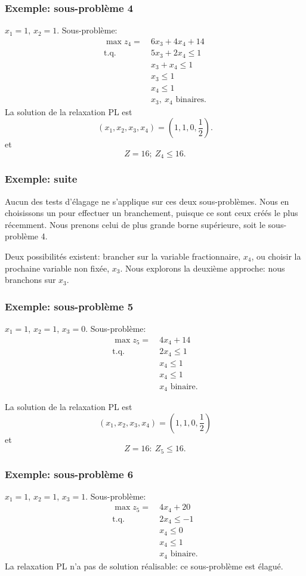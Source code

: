 \documentclass[usepdftitle=false]{beamer}
\def\st{\mbox{t.q. }}
\begin{document}
\begin{frame}
\frametitle{Exemple: sous-problème 4}

$x_1 = 1$, $x_2 = 1$. Sous-problème:
\begin{align*}
\max z_4 =\ & 6x_3 + 4x_4 + 14 \\
\st{} & 5 x_3 + 2x_4 \leq 1 \\
& x_3 + x_4 \leq 1 \\
& x_3 \leq 1 \\
& x_4 \leq 1 \\
& x_3,\ x_4 \mbox{ binaires}.
\end{align*}
La solution de la relaxation PL est
\[
( x_1, x_2, x_3, x_4) = \left(1,1,0, \frac{1}{2} \right).
\]
et
\[
Z = 16;\ Z_4 \leq 16.
\]

\end{frame}

\begin{frame}
\frametitle{Exemple: suite}

Aucun des tests d'élagage ne s'applique sur ces deux sous-problèmes.
Nous en choisissons un pour effectuer un branchement, puisque ce sont ceux créés le plus récemment.
Nous prenons celui de plus grande borne supérieure, soit le sous-problème 4.

\mbox{}

Deux possibilités existent: brancher sur la variable fractionnaire, $x_4$, ou choisir la prochaine variable non fixée, $x_3$.
Nous explorons la deuxième approche: nous branchons sur $x_3$.

\end{frame}

\begin{frame}
\frametitle{Exemple: sous-problème 5}

$x_1 = 1$, $x_2 = 1$, $x_3 = 0$. Sous-problème:
\begin{align*}
\max z_5 =\ & 4x_4 + 14 \\
\st{} & 2x_4 \leq 1 \\
& x_4 \leq 1 \\
& x_4 \leq 1 \\
& x_4 \mbox{ binaire}.
\end{align*}

La solution de la relaxation PL est
\[
( x_1, x_2, x_3, x_4) = \left(1,1,0, \frac{1}{2} \right)
\]
et
\[
Z = 16:\ Z_5 \leq 16.
\]

\end{frame}

\begin{frame}
\frametitle{Exemple: sous-problème 6}

$x_1 = 1$, $x_2 = 1$, $x_3 = 1$. Sous-problème:
\begin{align*}
\max z_5 =\ & 4x_4 + 20 \\
\st{} & 2x_4 \leq -1 \\
& x_4 \leq 0 \\
& x_4 \leq 1 \\
& x_4 \mbox{ binaire}.
\end{align*}
La relaxation PL n'a pas de solution réalisable: ce sous-problème est élagué.

\end{frame}
\end{document}
